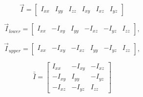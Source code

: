 \documentclass{article}
\begin{document}
\[ \vec{I} = \begin{bmatrix} I_{xx} & I_{yy} & I_{zz} & I_{xy} & I_{xz} & I_{yz} \end{bmatrix} \]
\pagebreak

\[ \vec{I}_{lower} = \begin{bmatrix} I_{xx} & -I_{xy} & I_{yy} & -I_{xz} & -I_{yz} & I_{zz} \end{bmatrix}, \]
\pagebreak

\[ \vec{I}_{upper} = \begin{bmatrix} I_{xx} & -I_{xy} & -I_{xz} & I_{yy} & -I_{yz} & I_{zz} \end{bmatrix}, \]
\pagebreak

\[ \bar{\bar{I}} = \begin{bmatrix} I_{xx} & -I_{xy} & -I_{xz} \\ -I_{xy} & I_{yy} & -I_{yz} \\ -I_{xz} & -I_{yz} & I_{zz} \end{bmatrix} \]
\pagebreak
\end{document}

